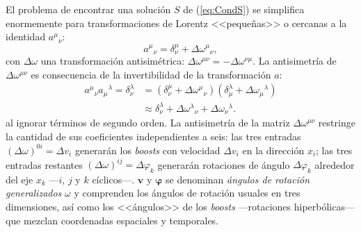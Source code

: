El problema de encontrar una solución $S$ de (\ref{eq:CondS}) se simplifica enormemente para transformaciones de Lorentz <<pequeñas>> o cercanas a la identidad $a^{\mu}{}_{\nu}$:\footnotemark
\begin{equation}\label{eq:LorentzInf}
a^{\mu}{}_{\nu}=\delta^{\mu}_{\nu}+\Delta \omega^{\mu}{}_{\nu},
\end{equation}
con $\Delta \omega$ una transformación antisimétrica: $\Delta \omega^{\mu \nu}=-\Delta \omega^{\nu \mu}$. La antisimetría de $\Delta \omega^{\mu \nu}$ es consecuencia de la invertibilidad de la transformación $a$:
\begin{align*}
a^{\mu}{}_{\nu}a_{\mu}{}^{\lambda}= \delta_{\nu}^{\lambda}&= (\delta^{\mu}_{\nu}+\Delta \omega^{\mu}{}_{\nu})(\delta^{\lambda}_{\mu}+\Delta \omega_{\mu}{}^{\lambda}) \\
& \approx  \delta_{\nu}^{\lambda}+\Delta \omega^{\lambda}{}_{\nu} +\Delta \omega_{\nu}{}^{\lambda}.
\end{align*}
al ignorar términos de segundo orden. La antisimetría de la matriz $\Delta \omega^{\mu \nu}$ restringe la cantidad de sus coeficientes independientes a seis: las tres entradas $(\Delta \omega)^{0i}=\Delta v_i$ generarán los \textit{boosts} con velocidad $\Delta v_i$ en la dirección $x_i$; las tres entradas restantes $(\Delta \omega)^{ij}=\Delta \varphi_k$ generarán rotaciones de ángulo $\Delta \varphi_k$ alrededor del eje $x_k$ ---$i$, $j$ y $k$ cíclicos---. $\mathbf{v}$ y $\bm{\varphi}$ se denominan \textit{ángulos de rotación generalizados} $\omega$ y comprenden los ángulos de rotación usuales en tres dimensiones, así como los <<ángulos>> de los \textit{boosts} ---rotaciones hiperbólicas--- que mezclan coordenadas espaciales y temporales.

